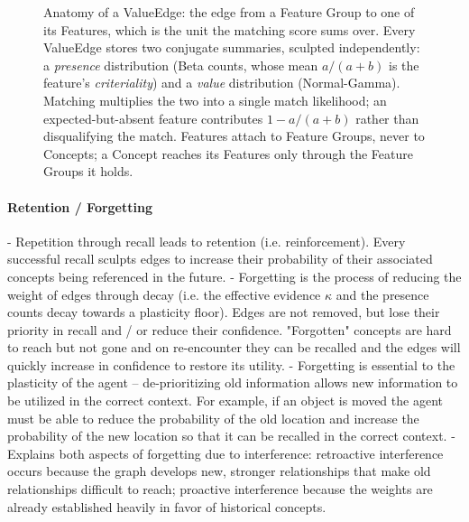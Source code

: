 \documentclass{article}
\begin{document}
\begin{figure}[ht]
  \caption{Anatomy of a ValueEdge: the edge from a Feature Group to one of its Features, which is the unit the matching score sums over. Every ValueEdge stores two conjugate summaries, sculpted independently: a \emph{presence} distribution (Beta counts, whose mean $a/(a+b)$ is the feature's \emph{criteriality}) and a \emph{value} distribution (Normal-Gamma). Matching multiplies the two into a single match likelihood; an expected-but-absent feature contributes $1-a/(a+b)$ rather than disqualifying the match. Features attach to Feature Groups, never to Concepts; a Concept reaches its Features only through the Feature Groups it holds.}
  \label{fig:edge-anatomy}
\end{figure}

\paragraph{Retention / Forgetting}
- Repetition through recall leads to retention (i.e. reinforcement). Every successful recall sculpts edges to increase their probability of their associated concepts being referenced in the future.
- Forgetting is the process of reducing the weight of edges through decay (i.e. the effective evidence $\kappa$ and the presence counts decay towards a plasticity floor). Edges are not removed, but lose their priority in recall and / or reduce their confidence. "Forgotten" concepts are hard to reach but not gone and on re-encounter they can be recalled and the edges will quickly increase in confidence to restore its utility.
- Forgetting is essential to the plasticity of the agent -- de-prioritizing old information allows new information to be utilized in the correct context. For example, if an object is moved the agent must be able to reduce the probability of the old location and increase the probability of the new location so that it can be recalled in the correct context.
- Explains both aspects of forgetting due to interference: retroactive interference occurs because the graph develops new, stronger relationships that make old relationships difficult to reach; proactive interference because the weights are already established heavily in favor of historical concepts.
\end{document}
